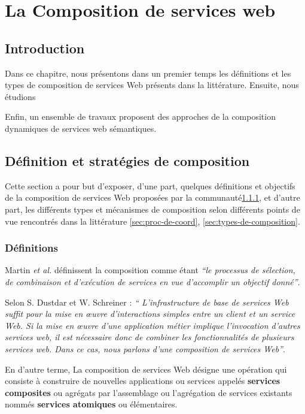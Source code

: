 \chapter{La Composition de services web}

\section*{Introduction}
 

Dans ce chapitre, nous présentons dans un premier temps les %
définitions et les types de composition de services Web présents dans
la littérature. Ensuite, nous étudions

Enfin, un ensemble de travaux proposent des approches de la
composition dynamiques de services web sémantiques.

\newpage
\section{Définition et stratégies de composition}
\label{sec:defs}
Cette section a pour but d'exposer, d'une part, quelques définitions
et objectifs de la composition de services Web proposées par la
communauté\ref{sec:definitions}, et d'autre part, les différents types
et mécanismes de composition selon différents points de vue rencontrés
dans la littérature \ref{sec:proc-de-coord}, \ref{sec:types-de-composition}.

  \subsection{Définitions}
  \label{sec:definitions}
  Martin \emph{et al.} \cite{martin2004owl} définissent la composition
  comme étant \emph{``le processus de sélection, de combinaison et
    d'exécution de services en vue d'accomplir un objectif donné''}.\bigskip

  Selon S. Dustdar et W. Schreiner \cite{dustdar2005survey} : \emph{``
    L'infrastructure de base de services Web suffit pour la mise en
    œuvre d'interactions simples entre un client et un service Web. Si
    la mise en œuvre d'une application métier implique l'invocation
    d'autres services web, il est nécessaire donc de combiner les
    fonctionnalités de plusieurs services web. Dans ce cas, nous
    parlons d'une composition de services Web''}.\bigskip

  En d'autre terme, La composition de services Web désigne une
  opération qui consiste à construire de nouvelles applications ou
  services appelés \textbf{services composites} ou agrégats par
  l'assemblage ou l'agrégation de services existants nommés
  \textbf{services atomiques} ou élémentaires.\bigskip

